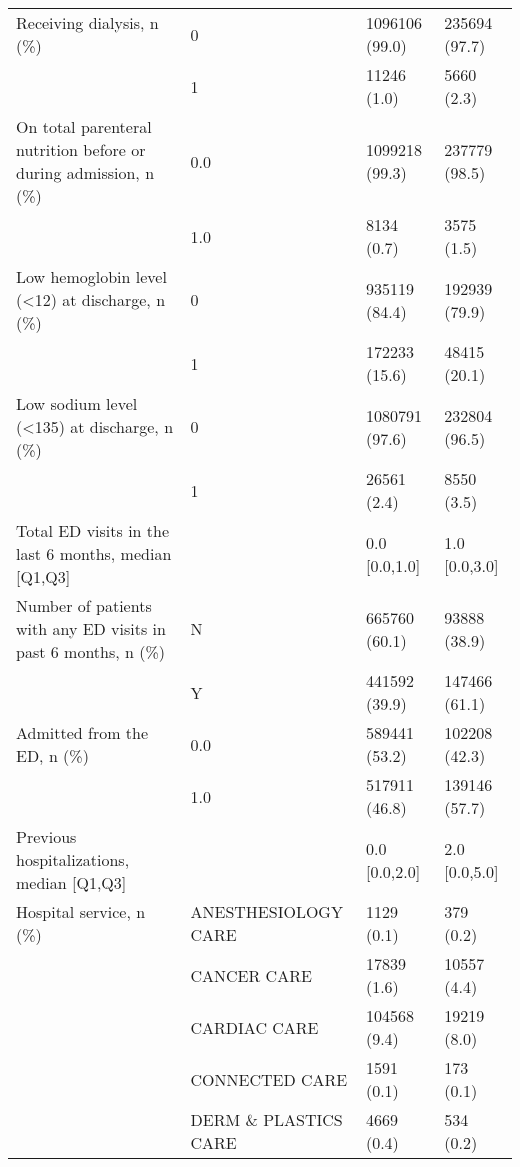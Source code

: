 \begin{tabular}{llll}
Receiving dialysis, n (\%) & 0 &           1096106 (99.0) &     235694 (97.7) \\
                                       & 1 &              11246 (1.0) &        5660 (2.3) \\
On total parenteral nutrition before or during admission, n (\%) & 0.0 &           1099218 (99.3) &     237779 (98.5) \\
                                       & 1.0 &               8134 (0.7) &        3575 (1.5) \\
Low hemoglobin level (<12) at discharge, n (\%) & 0 &            935119 (84.4) &     192939 (79.9) \\
                                       & 1 &            172233 (15.6) &      48415 (20.1) \\
Low sodium level (<135) at discharge, n (\%) & 0 &           1080791 (97.6) &     232804 (96.5) \\
                                       & 1 &              26561 (2.4) &        8550 (3.5) \\
Total ED visits in the last 6 months, median [Q1,Q3] &   &            0.0 [0.0,1.0] &     1.0 [0.0,3.0] \\
Number of patients with any ED visits in past 6 months, n (\%) & N &            665760 (60.1) &      93888 (38.9) \\
                                       & Y &            441592 (39.9) &     147466 (61.1) \\
Admitted from the ED, n (\%) & 0.0 &            589441 (53.2) &     102208 (42.3) \\
                                       & 1.0 &            517911 (46.8) &     139146 (57.7) \\
Previous hospitalizations, median [Q1,Q3] &   &            0.0 [0.0,2.0] &     2.0 [0.0,5.0] \\
Hospital service, n (\%) & ANESTHESIOLOGY CARE &               1129 (0.1) &         379 (0.2) \\
                                       & CANCER CARE &              17839 (1.6) &       10557 (4.4) \\
                                       & CARDIAC CARE &             104568 (9.4) &       19219 (8.0) \\
                                       & CONNECTED CARE &               1591 (0.1) &         173 (0.1) \\
                                       & DERM \& PLASTICS CARE &               4669 (0.4) &         534 (0.2) \\

\end{tabular}
